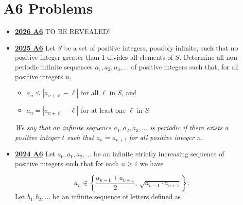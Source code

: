 \documentclass[11pt]{scrartcl}
\begin{document}
\section*{A6 Problems}  \label{A6}
 \begin{itemize}[leftmargin=*]

\item \href{https://www.imo-official.org/assets/documents/problems/2026/IMO2026SL.pdf}{\textbf{2026 A6}} TO BE REVEALED!

 \item \href{https://artofproblemsolving.com/community/c6h3866851p38676935}{\textbf{2025 A6}}  Let $S$ be a set of positive integers, possibly infinite, such that no positive integer greater than $1$ divides all elements of $S$. Determine all non-periodic infinite sequences $a_1,a_2,a_3,\dots$ of positive integers such that, for all positive integers $n$,
\begin{itemize}[leftmargin=*] 
\item[$\bullet$] $a_n\leqslant |a_{n+\ell}-\ell|$ for all $\ell$ in $S$, and
\item[$\bullet$] $a_n=|a_{n+\ell}-\ell|$ for at least one $\ell$ in $S$.
\end{itemize}
\textit{We say that an infinite sequence $a_1,a_2,a_3,\dots$ is periodic if there exists a positive integer $t$ such that $a_n=a_{n+t}$ for all positive integer $n$.}
\item \href{https://artofproblemsolving.com/community/c6h3610454p35340929}{\textbf{2024 A6}} Let $a_0, a_1, a_2, \dots$ be an infinite strictly increasing sequence of positive integers such that for each $n \geqslant  1$ we have

$$
a_n \in \left\{ \frac{a_{n-1} + a_{n+1}}{2},\ \sqrt{a_{n-1} \cdot a_{n+1}} \right\}.
$$Let $b_1, b_2, \dots$ be an infinite sequence of letters defined as


\end{itemize}
\end{document}

